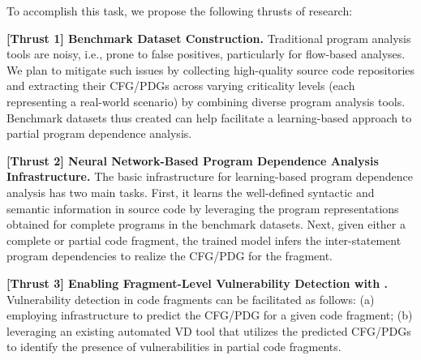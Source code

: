 To accomplish this task, we propose the following thrusts of research:

\vspace{3pt}
\noindent \textbf{[Thrust 1] Benchmark Dataset Construction.} Traditional program analysis tools are noisy, i.e., prone to false positives, particularly for flow-based analyses. We plan to mitigate such issues by collecting high-quality source code repositories and extracting their CFG/PDGs across varying criticality levels (each representing a real-world scenario) by combining diverse program analysis tools. Benchmark datasets thus created can help facilitate a learning-based approach to partial program dependence analysis.

\vspace{3pt}
\noindent \textbf{[Thrust 2] Neural Network-Based Program Dependence Analysis Infrastructure.} The basic infrastructure for learning-based program dependence analysis has two main tasks. First, it learns the well-defined syntactic and semantic information in source code by leveraging the program representations obtained for complete programs in the benchmark datasets. Next, given either a complete or partial code fragment, the trained model infers the inter-statement program dependencies to realize the CFG/PDG for the fragment.

\vspace{3pt}
\noindent \textbf{[Thrust 3] Enabling Fragment-Level Vulnerability Detection with \tool.} Vulnerability detection in code fragments can be facilitated as follows: (a) employing \tool infrastructure to predict the CFG/PDG for a given code fragment; (b) leveraging an existing automated VD tool that utilizes the predicted CFG/PDGs to identify the presence of vulnerabilities in partial code fragments.
